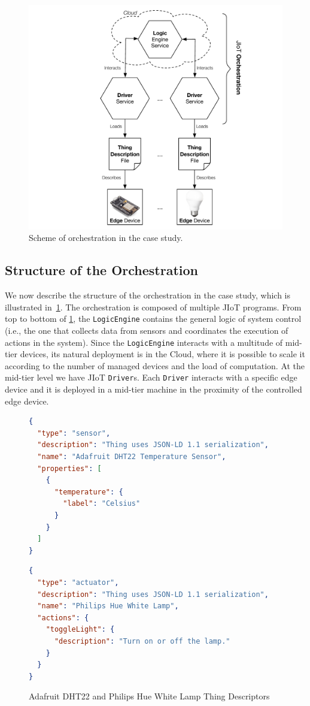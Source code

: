 \begin{figure}[b]
  \centering
  \includegraphics[width=.8\textwidth]{case_study_abstraction.pdf}
  \caption{Scheme of orchestration in the case study.}
  \label{fig:case_study_abstraction}
\end{figure}

\subsection{Structure of the Orchestration}

We now describe the structure of the orchestration in the case study, which is
illustrated in~\cref{fig:case_study_abstraction}.
%
The orchestration is composed of multiple JIoT programs. From top to bottom of
\cref{fig:case_study_abstraction}, the \texttt{LogicEngine} contains the
general logic of system control (i.e., the one that collects data from sensors
and coordinates the execution of actions in the system). Since the
\texttt{LogicEngine} interacts with a multitude of mid-tier devices, its
natural deployment is in the Cloud, where it is possible to scale it according
to the number of managed devices and the load of computation. At the mid-tier
level we have JIoT \texttt{Driver}s. Each \texttt{Driver} interacts with a
specific edge device and it is deployed in a mid-tier machine in the proximity
of the controlled edge device.

\begin{figure}[b]
  \centering
  \begin{lstlisting}[language=json]
{
  "type": "sensor",
  "description": "Thing uses JSON-LD 1.1 serialization",
  "name": "Adafruit DHT22 Temperature Sensor",
  "properties": [
    {
      "temperature": {
        "label": "Celsius"
      }
    }
  ]
}
\end{lstlisting}
\begin{lstlisting}[language=json]
{
  "type": "actuator",
  "description": "Thing uses JSON-LD 1.1 serialization",
  "name": "Philips Hue White Lamp",
  "actions": {
    "toggleLight": {
      "description": "Turn on or off the lamp."
    }
  }
}
\end{lstlisting}
  \caption{Adafruit DHT22 and Philips Hue White Lamp Thing Descriptors}
  \label{fig:sensor_descriptor}
\end{figure}

